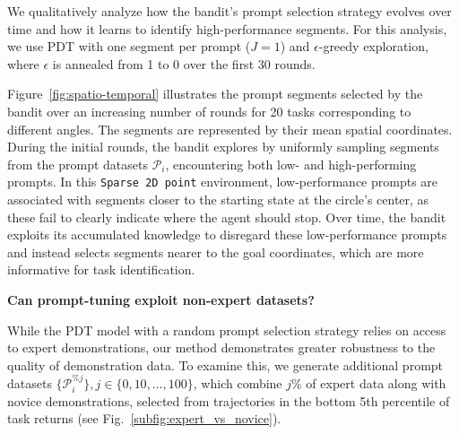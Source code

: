 \documentclass{article} %
\begin{document}
We qualitatively analyze how the bandit's prompt selection strategy evolves over time and how it learns to identify high-performance segments. For this analysis, we use PDT with one segment per prompt ($J=1$) and $\epsilon$-greedy exploration, where $\epsilon$ is annealed from 1 to 0 over the first 30 rounds. 

Figure~\ref{fig:spatio-temporal} illustrates the prompt segments selected by the bandit over an increasing number of rounds for 20 tasks corresponding to different angles. The segments are represented by their mean spatial coordinates. During the initial rounds, the bandit explores by uniformly sampling segments from the prompt datasets $\mathcal{P}_i$, encountering both low- and high-performing prompts. In this \texttt{Sparse 2D point} environment, low-performance prompts are associated with segments closer to the starting state at the circle's center, as these fail to clearly indicate where the agent should stop. Over time, the bandit exploits its accumulated knowledge to disregard these low-performance prompts and instead selects segments nearer to the goal coordinates, which are more informative for task identification.

\textbf{Can prompt-tuning exploit non-expert datasets?}

%
%
While the PDT model with a random prompt selection strategy relies on access to expert demonstrations, our method demonstrates greater robustness to the quality of demonstration data. To examine this, we generate additional prompt datasets $\{\mathcal{P}_i^{\%j}\}, j \in \{0, 10, \dots, 100\}$, which combine $j\%$ of expert data along with novice demonstrations, selected from trajectories in the bottom 5th percentile of task returns (see Fig.~\ref{subfig:expert_vs_novice}). 
\end{document}
